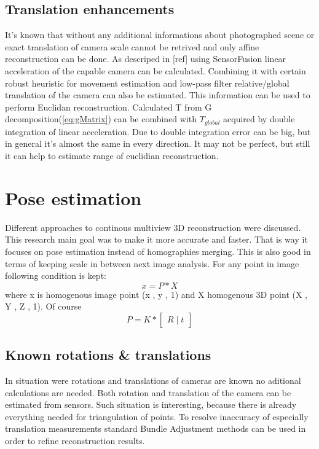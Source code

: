 \subsection{Translation enhancements}
It's known that without any additional informations about photographed scene or exact translation of camera scale cannot be retrived and only affine reconstruction can be done. As descriped in [ref] using SensorFusion linear acceleration of the capable camera can be calculated. Combining it with certain robust heuristic for movement estimation and low-pass filter relative/global translation of the camera can also be estimated. This information can be used to perform Euclidan reconstruction. Calculated T from G decomposition(\ref{eq:gMatrix}) can be combined with $T_{global}$ acquired by double integration of linear acceleration. Due to double integration error can be big, but in general it's almost the same in every direction. It may not be perfect, but still it can help to estimate range of euclidian reconstruction.
\section{Pose estimation}
Different approaches to continous multiview 3D reconstruction were discussed. This research main goal was to make it more accurate and faster. That is way it focuses on pose estimation instead of homographies merging. This is also good in terms of keeping scale in between next image analysis. For any point in image following condition is kept:
\begin{equation} \label{eq:projectionEquation}
 x = P * X
\end{equation}
where x is homogenous image point (x , y , 1) and X homogenous 3D  point (X , Y , Z , 1). Of course 
\begin{equation} \label{eq:projectionEquation}
 P = K * \begin{bmatrix}R\mid t\end{bmatrix}
\end{equation}
\subsection{Known rotations \& translations}
In situation were rotations and translations of cameras are known no aditional calculations are needed. Both rotation and translation of the camera can be estimated from sensors. Such situation is interesting, because there is already everything needed for triangulation of points. To resolve inaccuracy of especially translation measurements standard Bundle Adjustment methods can be used in order to refine reconstruction results.
